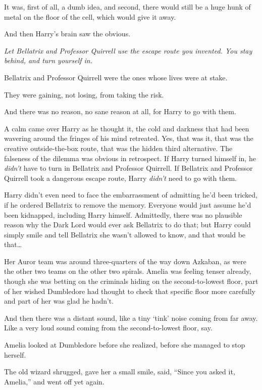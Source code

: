 It was, first of all, a dumb idea, and second, there would still be a huge hunk of metal on the floor of the cell, which would give it away.

And then Harry’s brain saw the obvious.

\emph{Let Bellatrix and Professor Quirrell use the escape route you invented. You stay behind, and turn yourself in.}

Bellatrix and Professor Quirrell were the ones whose lives were at stake.

They were gaining, not losing, from taking the risk.

And there was no reason, no sane reason at all, for Harry to go with them.

A calm came over Harry as he thought it, the cold and darkness that had been wavering around the fringes of his mind retreated. Yes, that was it, that was the creative outside-the-box route, that was the hidden third alternative. The falseness of the dilemma was obvious in retrospect. If Harry turned himself in, he \emph{didn’t} have to turn in Bellatrix and Professor Quirrell. If Bellatrix and Professor Quirrell took a dangerous escape route, Harry \emph{didn’t} need to go with them.

Harry didn’t even need to face the embarrassment of admitting he’d been tricked, if he ordered Bellatrix to remove the memory. Everyone would just assume he’d been kidnapped, including Harry himself. Admittedly, there was no plausible reason why the Dark Lord would ever ask Bellatrix to do that; but Harry could simply smile and tell Bellatrix she wasn’t allowed to know, and that would be that…

\later

Her Auror team was around three-quarters of the way down Azkaban, as were the other two teams on the other two spirals. Amelia was feeling tenser already, though she was betting on the criminals hiding on the second-to-lowest floor, part of her wished Dumbledore had thought to check that specific floor more carefully and part of her was glad he hadn’t.

And then there was a distant sound, like a tiny ‘tink’ noise coming from far away. Like a very loud sound coming from the second-to-lowest floor, say.

Amelia looked at Dumbledore before she realized, before she managed to stop herself.

The old wizard shrugged, gave her a small smile, said, “Since you asked it, Amelia,” and went off yet again.

